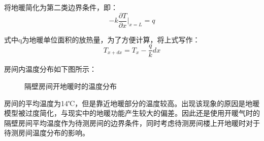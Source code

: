 将地暖简化为第二类边界条件，即：
\begin{equation}
    -k\frac{\partial T}{\partial x}\big|_{x=L} = q
\end{equation}

式中q为地暖单位面积的放热量，为了方便计算，将上式写作：
\begin{equation}
    T_{x+dx} = T_x -\frac{q}{k}dx
\end{equation}

房间内温度分布如下图所示：
\begin{figure}[h]
    \centering
    \qquad
    \caption{隔壁房间开地暖时的温度分布}
    \label{fig:dinuan}
\end{figure}

房间的平均温度为14℃，但是靠近地暖部分的温度较高。出现该现象的原因是地暖模型被过度简化，与现实中的地暖功能产生较大的偏差。因此还是使用开暖气时的隔壁房间平均温度作为待测房间的边界条件，同时考虑待测房间楼上开地暖时对于待测房间温度分布的影响。